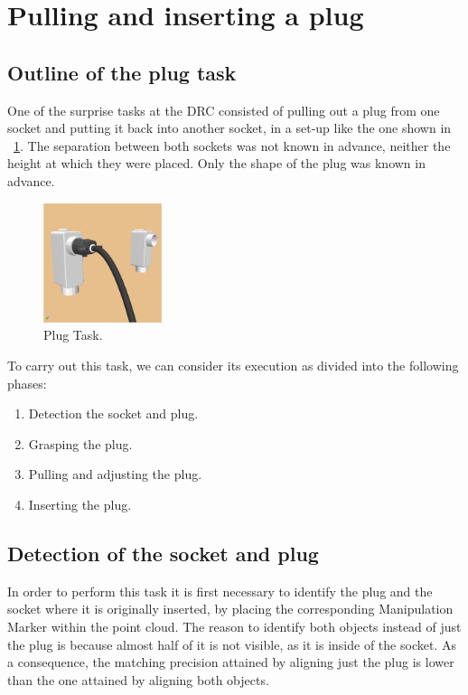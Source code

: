 \section{Pulling and inserting a plug}
	\label{sec:plug}
	
	\subsection{Outline of the plug task}
	
		One of the surprise tasks at the DRC consisted of pulling out a plug
		from one socket and putting it back into another socket, in a set-up like the one shown in
		\figurename~\ref{fig:Sockets-Plug}.
		The separation between both sockets was not known in advance, neither the height at which
		they were placed.
		Only the shape of the plug was known in advance.
		
		\begin{figure}[t]
			\centering
			\includegraphics[height = 3.5cm]{img/Sockets-Plug}
			\caption{Plug Task.}
			\label{fig:Sockets-Plug}
		\end{figure}
		
		To carry out this task, we can consider its execution as divided into the following phases:
		\begin{enumerate}
			\item Detection the socket and plug.
			\item Grasping the plug.
			\item Pulling and adjusting the plug.
			\item Inserting the plug.
		\end{enumerate}
	
	\subsection{Detection of the socket and plug}
		
		In order to perform this task it is first necessary to identify the plug and the socket where
		it is originally inserted, by placing the corresponding Manipulation Marker within the point cloud.
		The reason to identify both objects instead of just the plug is because almost half of it
		is not visible, as it is inside of the socket.
		As a consequence, the matching precision attained by aligning just the plug is lower than the one
		attained by aligning both objects.
		
